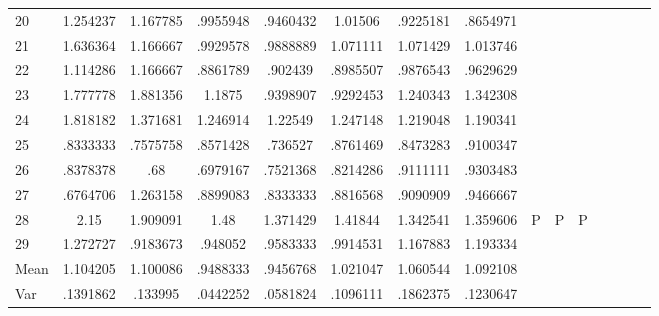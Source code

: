 \documentclass[a4paper,12pt]{article}
\begin{document}
\begin{landscape}
\begin{footnotesize}
\begin{center}
\begin{longtable}{lcccccccccccccc|}
20&1.254237&1.167785&.9955948&.9460432&1.01506&.9225181&.8654971&&&&&&& \\
21&1.636364&1.166667&.9929578&.9888889&1.071111&1.071429&1.013746&&&&&&& \\
22&1.114286&1.166667&.8861789&.902439&.8985507&.9876543&.9629629&&&&&&& \\
23&1.777778&1.881356&1.1875&.9398907&.9292453&1.240343&1.342308&&&&&&& \\
24&1.818182&1.371681&1.246914&1.22549&1.247148&1.219048&1.190341&&&&&&& \\
25&.8333333&.7575758&.8571428&.736527&.8761469&.8473283&.9100347&&&&&&& \\
26&.8378378&.68&.6979167&.7521368&.8214286&.9111111&.9303483&&&&&&& \\
27&.6764706&1.263158&.8899083&.8333333&.8816568&.9090909&.9466667&&&&&&& \\
28&2.15&1.909091&1.48&1.371429&1.41844&1.342541&1.359606&P&P&P&&&& \\
29&1.272727&.9183673&.948052&.9583333&.9914531&1.167883&1.193334&&&&&&& \\
Mean&1.104205&1.100086&.9488333&.9456768&1.021047&1.060544&1.092108&&&&&&& \\
Var&.1391862&.133995&.0442252&.0581824&.1096111&.1862375&.1230647&&&&&&& \\ \hline
\end{longtable}
\end{center}
\end{footnotesize}
\end{landscape}
\end{document}
